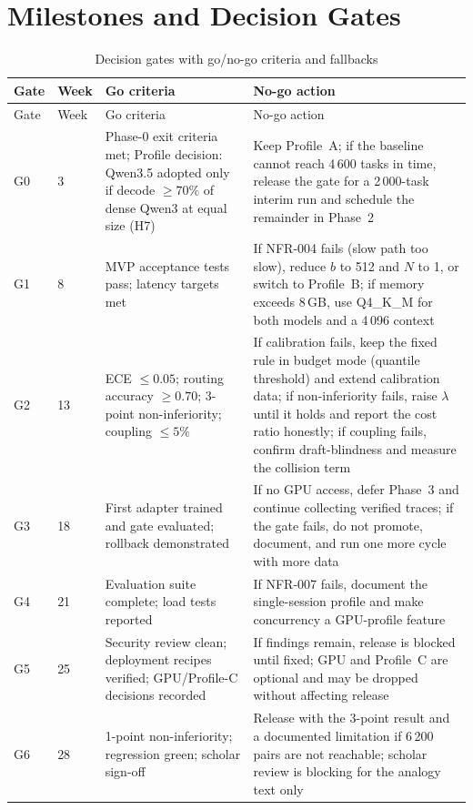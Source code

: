 \documentclass[11pt,a4paper]{article}
\begin{document}
\section{Milestones and Decision Gates}
\begin{longtable}{@{}p{1.0cm}p{1.0cm}p{6.2cm}p{6.4cm}@{}}
\caption{Decision gates with go/no-go criteria and fallbacks}\\
\toprule Gate & Week & Go criteria & No-go action\\\midrule\endfirsthead
\toprule Gate & Week & Go criteria & No-go action\\\midrule\endhead\bottomrule\endfoot
G0 & 3 & Phase-0 exit criteria met; Profile decision: Qwen3.5 adopted only if decode $\ge70\%$ of dense Qwen3 at equal size (H7) & Keep Profile~A; if the baseline cannot reach 4\,600 tasks in time, release the gate for a 2\,000-task interim run and schedule the remainder in Phase~2\\
G1 & 8 & MVP acceptance tests pass; latency targets met & If NFR-004 fails (slow path too slow), reduce $b$ to 512 and $N$ to 1, or switch to Profile~B; if memory exceeds 8\,GB, use Q4\_K\_M for both models and a 4\,096 context\\
G2 & 13 & ECE $\le0.05$; routing accuracy $\ge0.70$; 3-point non-inferiority; coupling $\le5\%$ & If calibration fails, keep the fixed rule in budget mode (quantile threshold) and extend calibration data; if non-inferiority fails, raise $\lambda$ until it holds and report the cost ratio honestly; if coupling fails, confirm draft-blindness and measure the collision term\\
G3 & 18 & First adapter trained and gate evaluated; rollback demonstrated & If no GPU access, defer Phase~3 and continue collecting verified traces; if the gate fails, do not promote, document, and run one more cycle with more data\\
G4 & 21 & Evaluation suite complete; load tests reported & If NFR-007 fails, document the single-session profile and make concurrency a GPU-profile feature\\
G5 & 25 & Security review clean; deployment recipes verified; GPU/Profile-C decisions recorded & If findings remain, release is blocked until fixed; GPU and Profile~C are optional and may be dropped without affecting release\\
G6 & 28 & 1-point non-inferiority; regression green; scholar sign-off & Release with the 3-point result and a documented limitation if 6\,200 pairs are not reachable; scholar review is blocking for the analogy text only\\
\end{longtable}
\end{document}
